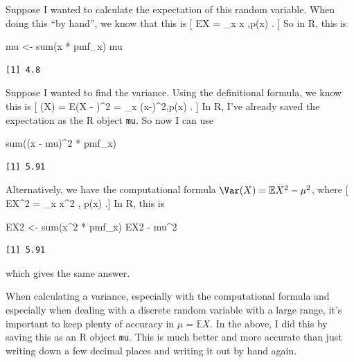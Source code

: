 \documentclass[
  letterpaper,
  DIV=11,
  numbers=noendperiod]{scrreprt}
\newenvironment{Shaded}{\begin{snugshade}}{\end{snugshade}}
\newcommand{\DecValTok}[1]{\textcolor[rgb]{0.68,0.00,0.00}{#1}}
\newcommand{\FunctionTok}[1]{\textcolor[rgb]{0.28,0.35,0.67}{#1}}
\newcommand{\NormalTok}[1]{\textcolor[rgb]{0.00,0.23,0.31}{#1}}
\newcommand{\OtherTok}[1]{\textcolor[rgb]{0.00,0.23,0.31}{#1}}
\newcommand{\SpecialCharTok}[1]{\textcolor[rgb]{0.37,0.37,0.37}{#1}}
\theoremstyle{remark}
\begin{document}
Suppose I wanted to calculate the expectation of this random variable.
When doing this ``by hand'', we know that this is {[} \mathbb EX =
\sum\_x x ,p(x) . {]} So in R, this is

\begin{Shaded}
\begin{Highlighting}[]
\NormalTok{mu }\OtherTok{\textless{}{-}} \FunctionTok{sum}\NormalTok{(x }\SpecialCharTok{*}\NormalTok{ pmf\_x)}
\NormalTok{mu}
\end{Highlighting}
\end{Shaded}

\begin{verbatim}
[1] 4.8
\end{verbatim}

Suppose I wanted to find the variance. Using the definitional formula,
we know this is {[} \Var(X) = \mathbb E(X - \mu)\^{}2 = \sum\_x
(x-\mu)\^{}2,p(x) . {]} In R, I've already saved the expectation as the
R object \texttt{mu}. So now I can use

\begin{Shaded}
\begin{Highlighting}[]
\FunctionTok{sum}\NormalTok{((x }\SpecialCharTok{{-}}\NormalTok{ mu)}\SpecialCharTok{\^{}}\DecValTok{2} \SpecialCharTok{*}\NormalTok{ pmf\_x)}
\end{Highlighting}
\end{Shaded}

\begin{verbatim}
[1] 5.91
\end{verbatim}

Alternatively, we have the computational formula
\(\Var(X) = \mathbb EX^2 - \mu^2\), where {[} \mathbb EX\^{}2 = \sum\_x
x\^{}2 , p(x) .{]} In R, this is

\begin{Shaded}
\begin{Highlighting}[]
\NormalTok{EX2 }\OtherTok{\textless{}{-}} \FunctionTok{sum}\NormalTok{(x}\SpecialCharTok{\^{}}\DecValTok{2} \SpecialCharTok{*}\NormalTok{ pmf\_x)}
\NormalTok{EX2 }\SpecialCharTok{{-}}\NormalTok{ mu}\SpecialCharTok{\^{}}\DecValTok{2}
\end{Highlighting}
\end{Shaded}

\begin{verbatim}
[1] 5.91
\end{verbatim}

which gives the same answer.

When calculating a variance, especially with the computational formula
and especially when dealing with a discrete random variable with a large
range, it's important to keep plenty of accuracy in
\(\mu = \mathbb EX\). In the above, I did this by saving this as an R
object \texttt{mu}. This is much better and more accurate than just
writing down a few decimal places and writing it out by hand again.
\end{document}
